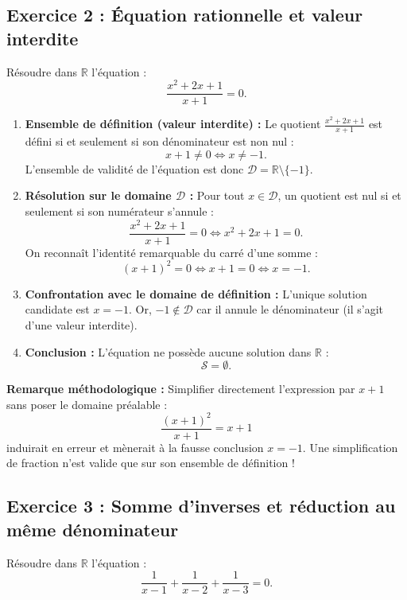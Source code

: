 \documentclass[11pt,a4paper]{article}
\newcommand{\R}{\mathbb{R}}
\begin{document}
\subsection*{Exercice 2 : Équation rationnelle et valeur interdite}
Résoudre dans $\R$ l'équation :
\[
\frac{x^2 + 2x + 1}{x + 1} = 0.
\]

\begin{correctionbox}
\begin{enumerate}
    \item \textbf{Ensemble de définition (valeur interdite) :}
    Le quotient $\frac{x^2+2x+1}{x+1}$ est défini si et seulement si son dénominateur est non nul :
    \[
    x + 1 \neq 0 \iff x \neq -1.
    \]
    L'ensemble de validité de l'équation est donc $\mathcal{D} = \R \setminus \{-1\}$.

    \item \textbf{Résolution sur le domaine $\mathcal{D}$ :}
    Pour tout $x \in \mathcal{D}$, un quotient est nul si et seulement si son numérateur s'annule :
    \[
    \frac{x^2 + 2x + 1}{x + 1} = 0 \iff x^2 + 2x + 1 = 0.
    \]
    On reconnaît l'identité remarquable du carré d'une somme :
    \[
    (x + 1)^2 = 0 \iff x + 1 = 0 \iff x = -1.
    \]

    \item \textbf{Confrontation avec le domaine de définition :}
    L'unique solution candidate est $x = -1$.
    Or, $-1 \notin \mathcal{D}$ car il annule le dénominateur (il s'agit d'une valeur interdite).

    \item \textbf{Conclusion :}
    L'équation ne possède aucune solution dans $\R$ :
    \[
    \mathcal{S} = \emptyset.
    \]
\end{enumerate}
\textbf{Remarque méthodologique :} Simplifier directement l'expression par $x+1$ sans poser le domaine préalable :
\[
\frac{(x+1)^2}{x+1} = x+1
\]
induirait en erreur et mènerait à la fausse conclusion $x = -1$. Une simplification de fraction n'est valide que sur son ensemble de définition !
\end{correctionbox}

\subsection*{Exercice 3 : Somme d'inverses et réduction au même dénominateur}
Résoudre dans $\R$ l'équation :
\[
\frac{1}{x-1} + \frac{1}{x-2} + \frac{1}{x-3} = 0.
\]
\end{document}
